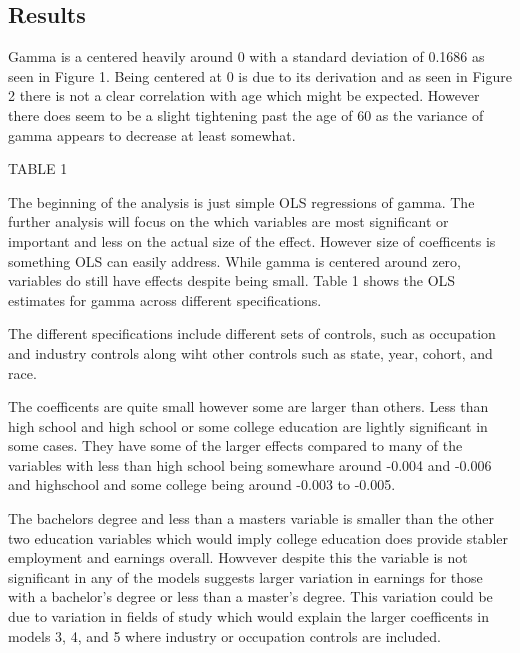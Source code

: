 \documentclass[12pt]{article}
\begin{document}
\begin{onehalfspace}
\section{Results}



Gamma is a centered heavily around 0 with a standard deviation of 0.1686 as seen in Figure 1. Being centered at 0 is due to its derivation and as seen in Figure 2 there is not a clear correlation with age which might be expected. However there does seem to be a slight tightening past the age of 60 as the variance of gamma appears to decrease at least somewhat.

TABLE 1

The beginning of the analysis is just simple OLS regressions of gamma. The further analysis will focus on the which variables are most significant or important and less on the actual size of the effect. However size of coefficents is something OLS can easily address. While gamma is centered around zero, variables do still have effects despite being small. Table 1 shows the OLS estimates for gamma across different specifications. 

The different specifications include different sets of controls, such as occupation and industry controls along wiht other controls such as state, year, cohort, and race.

The coefficents are quite small however some are larger than others. Less than high school and high school or some college education are lightly significant in some cases. They have some of the larger effects compared to many of the variables with less than high school being somewhare around -0.004 and -0.006 and highschool and some college being around -0.003 to -0.005. 

The bachelors degree and less than a masters variable is smaller than the other two education variables which would imply college education does provide stabler employment and earnings overall. Howvever despite this the variable is not significant in any of the models suggests larger variation in earnings for those with a bachelor's degree or less than a master's degree. This variation could be due to variation in fields of study which would explain the larger coefficents in models 3, 4, and 5 where industry or occupation controls are included.



\end{onehalfspace}
\end{document}
